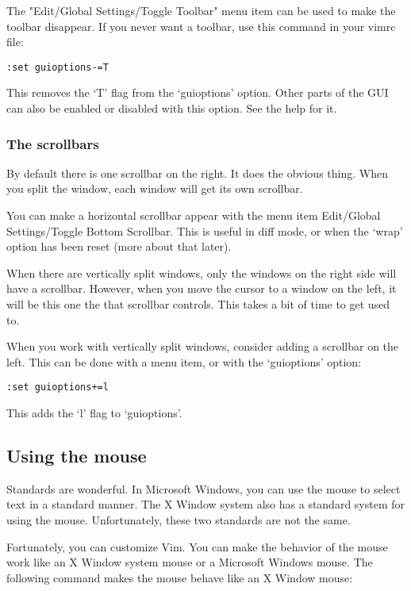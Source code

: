 The "Edit/Global Settings/Toggle Toolbar" menu item can be used to make the toolbar disappear.
If you never want a toolbar, use this command in your vimrc file:

 \begin{Verbatim}[samepage=true]
 :set guioptions-=T
 \end{Verbatim}

This removes the `T' flag from the `guioptions' option.
Other parts of the GUI can also be enabled or disabled with this option.
See the help for it.

\subsubsection{The scrollbars}
By default there is one scrollbar on the right.
It does the obvious thing.
When you split the window, each window will get its own scrollbar.

You can make a horizontal scrollbar appear with the menu item Edit/Global Settings/Toggle Bottom Scrollbar.
This is useful in diff mode, or when the `wrap' option has been reset (more about that later).

When there are vertically split windows, only the windows on the right side will have a scrollbar.
However, when you move the cursor to a window on the left, it will be this one the that scrollbar controls.
This takes a bit of time to get used to.

When you work with vertically split windows, consider adding a scrollbar on the left.
This can be done with a menu item, or with the `guioptions' option:

 \begin{Verbatim}[samepage=true]
 :set guioptions+=l
 \end{Verbatim}

This adds the `l' flag to `guioptions'.
\subsection{Using the mouse}
Standards are wonderful.
In Microsoft Windows, you can use the mouse to select text in a standard manner.
The X Window system also has a standard system for using the mouse.
Unfortunately, these two standards are not the same.

Fortunately, you can customize Vim.
You can make the behavior of the mouse work like an X Window system mouse or a Microsoft Windows mouse.
The following command makes the mouse behave like an X Window mouse:

